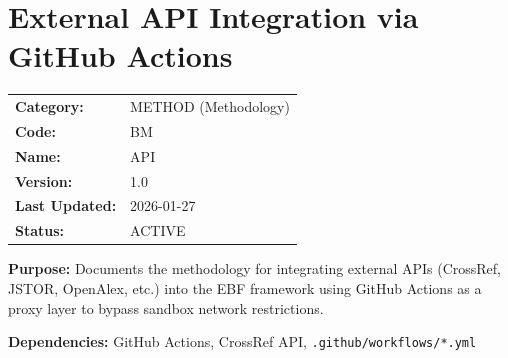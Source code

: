 
\chapter{External API Integration via GitHub Actions}
\label{app:api-integration}

\begin{tcolorbox}[colback=gray!5, colframe=gray!50, title=Appendix: BM METHOD-API]
\small
\begin{tabular}{ll}
\textbf{Category:} & METHOD (Methodology) \\
\textbf{Code:} & BM \\
\textbf{Name:} & API \\
\textbf{Version:} & 1.0 \\
\textbf{Last Updated:} & 2026-01-27 \\
\textbf{Status:} & ACTIVE \\
\end{tabular}

\vspace{0.5em}
\textbf{Purpose:} Documents the methodology for integrating external APIs (CrossRef, JSTOR, OpenAlex, etc.) into the EBF framework using GitHub Actions as a proxy layer to bypass sandbox network restrictions.

\textbf{Dependencies:} GitHub Actions, CrossRef API, \texttt{.github/workflows/*.yml}
\end{tcolorbox}

